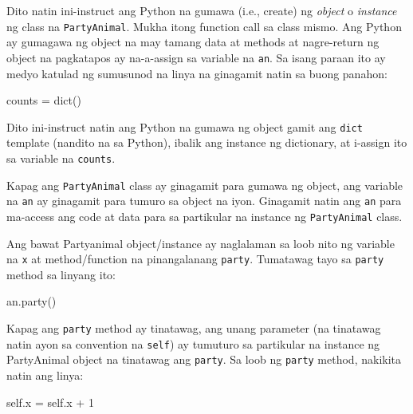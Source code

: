 \documentclass[10pt,]{book}
\newenvironment{Shaded}{}{}
\newcommand{\BuiltInTok}[1]{\textcolor[rgb]{0.00,0.50,0.00}{#1}}
\newcommand{\DecValTok}[1]{\textcolor[rgb]{0.25,0.63,0.44}{#1}}
\newcommand{\NormalTok}[1]{#1}
\newcommand{\OperatorTok}[1]{\textcolor[rgb]{0.40,0.40,0.40}{#1}}
\newcommand{\VariableTok}[1]{\textcolor[rgb]{0.10,0.09,0.49}{#1}}
\begin{document}
   

Dito natin ini-instruct ang Python na gumawa (i.e., create) ng
\emph{object} o \emph{instance} ng class na \texttt{PartyAnimal}. Mukha
itong function call sa class mismo. Ang Python ay gumagawa ng object na
may tamang data at methods at nagre-return ng object na pagkatapos ay
na-a-assign sa variable na \texttt{an}. Sa isang paraan ito ay medyo
katulad ng sumusunod na linya na ginagamit natin sa buong panahon:

\begin{Shaded}
\begin{Highlighting}[]
\NormalTok{counts }\OperatorTok{=} \BuiltInTok{dict}\NormalTok{()}
\end{Highlighting}
\end{Shaded}

Dito ini-instruct natin ang Python na gumawa ng object gamit ang
\texttt{dict} template (nandito na sa Python), ibalik ang instance ng
dictionary, at i-assign ito sa variable na \texttt{counts}.

Kapag ang \texttt{PartyAnimal} class ay ginagamit para gumawa ng object,
ang variable na \texttt{an} ay ginagamit para tumuro sa object na iyon.
Ginagamit natin ang \texttt{an} para ma-access ang code at data para sa
partikular na instance ng \texttt{PartyAnimal} class.

Ang bawat Partyanimal object/instance ay naglalaman sa loob nito ng
variable na \texttt{x} at method/function na pinangalanang
\texttt{party}. Tumatawag tayo sa \texttt{party} method sa linyang ito:

\begin{Shaded}
\begin{Highlighting}[]
\NormalTok{an.party()}
\end{Highlighting}
\end{Shaded}

Kapag ang \texttt{party} method ay tinatawag, ang unang parameter (na
tinatawag natin ayon sa convention na \texttt{self}) ay tumuturo sa
partikular na instance ng PartyAnimal object na tinatawag ang
\texttt{party}. Sa loob ng \texttt{party} method, nakikita natin ang
linya:

\begin{Shaded}
\begin{Highlighting}[]
\VariableTok{self}\NormalTok{.x }\OperatorTok{=} \VariableTok{self}\NormalTok{.x }\OperatorTok{+} \DecValTok{1}
\end{Highlighting}
\end{Shaded}
\end{document}
